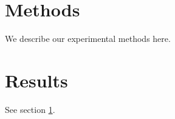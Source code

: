 \documentclass{article}
\begin{document}
\section{Methods}
\label{sec:methods}

We describe our experimental methods here.

\section{Results}

See section \ref{sec:methods}.
\end{document}

